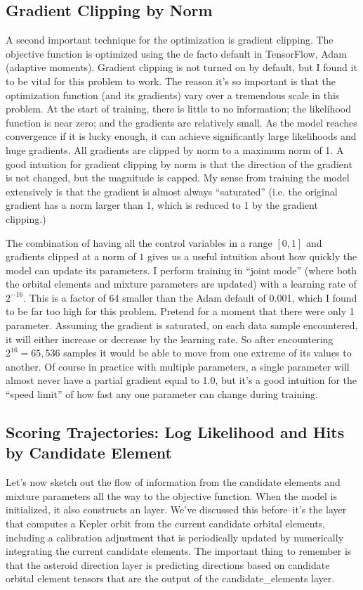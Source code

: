 \subsection{Gradient Clipping by Norm}
A second important technique for the optimization is gradient clipping.
The objective function is optimized using the de facto default in TensorFlow, Adam (adaptive moments).
Gradient clipping is not turned on by default, but I found it to be vital for this problem to work.
The reason it's so important is that the optimization function (and its gradients) vary over a tremendous scale in this problem.
At the start of training, there is little to no information; the likelihood function is near zero; and the gradients are relatively small.
As the model reaches convergence if it is lucky enough, it can achieve significantly large likelihoods and huge gradients.
All gradients are clipped by norm to a maximum norm of 1.
A good intuition for gradient clipping by norm is that the direction of the gradient is not changed, but the magnitude is capped.
My sense from training the model extensively is that the gradient is almost always ``saturated'' 
(i.e. the original gradient has a norm larger than 1, which is reduced to 1 by the gradient clipping.)

The combination of having all the control variables in a range $[0, 1]$ and gradients clipped at a norm of $1$
gives us a useful intuition about how quickly the model can update its parameters.
I perform training in ``joint mode'' (where both the orbital elements and mixture parameters are updated) with a learning rate of $2^{-16}$.  
This is a factor of 64 smaller than the Adam default of 0.001, which I found to be far too high for this problem.
Pretend for a moment that there were only 1 parameter.  
Assuming the gradient is saturated, on each data sample encountered, it will either increase or decrease by the learning rate.
So after encountering $2^{16} = 65,536$ samples it would be able to move from one extreme of its values to another.
Of course in practice with multiple parameters, a single parameter will almost never have a partial gradient equal to 1.0,
but it's a good intuition for the ``speed limit'' of how fast any one parameter can change during training.

\subsection{Scoring Trajectories: Log Likelihood and Hits by Candidate Element}
Let's now sketch out the flow of information from the candidate elements and mixture parameters all the way to the objective function.
When the model is initialized, it also constructs an  layer.
We've discussed this before--it's the layer that computes a Kepler orbit from the current candidate orbital elements,
including a calibration adjustment that is periodically updated by numerically integrating the current candidate elements.
The important thing to remember is that the asteroid direction layer is predicting directions based on candidate orbital element tensors
that are the output of the candidate\_elements layer.

